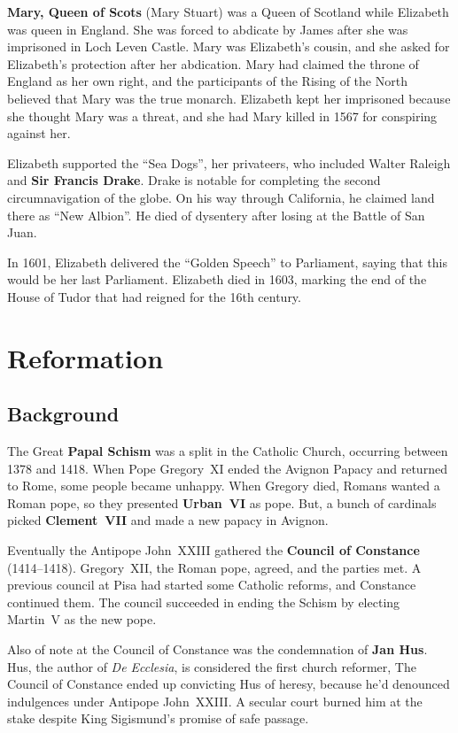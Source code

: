 \textbf{Mary, Queen of Scots} (Mary Stuart)
was a Queen of Scotland while Elizabeth was queen in England.
She was forced to abdicate by James after she was imprisoned in Loch Leven Castle.
Mary was Elizabeth's cousin, and she asked for Elizabeth's protection after her abdication.
Mary had claimed the throne of England as her own right,
and the participants of the Rising of the North believed that Mary was the true monarch.
Elizabeth kept her imprisoned because she thought Mary was a threat,
and she had Mary killed in 1567 for conspiring against her.

Elizabeth supported the ``Sea Dogs'', her privateers,
who included Walter Raleigh and \textbf{Sir Francis Drake}.
Drake is notable for completing the second circumnavigation of the globe.
On his way through California, he claimed land there as ``New Albion''.
He died of dysentery after losing at the Battle of San Juan.

In 1601, Elizabeth delivered the ``Golden Speech'' to Parliament,
saying that this would be her last Parliament.
Elizabeth died in 1603, marking the end of the House of Tudor that had reigned for the 16th century.

\section{Reformation}

\subsection*{Background}

The Great \textbf{Papal Schism} was a split in the Catholic Church, occurring between 1378 and 1418.
When Pope Gregory~XI ended the Avignon Papacy and returned to Rome, some people became unhappy.
When Gregory died, Romans wanted a Roman pope, so they presented \textbf{Urban~VI} as pope.
But, a bunch of cardinals picked \textbf{Clement~VII} and made a new papacy in Avignon.

Eventually the Antipope John~XXIII gathered the \textbf{Council of Constance} (1414--1418).
Gregory~XII, the Roman pope, agreed, and the parties met.
A previous council at Pisa had started some Catholic reforms, and Constance continued them.
The council succeeded in ending the Schism by electing Martin~V as the new pope.

Also of note at the Council of Constance was the condemnation of \textbf{Jan Hus}.
Hus, the author of \textit{De Ecclesia}, is considered the first church reformer,
The Council of Constance ended up convicting Hus of heresy,
because he'd denounced indulgences under Antipope John~XXIII\@.
A secular court burned him at the stake despite King Sigismund's promise of safe passage.


